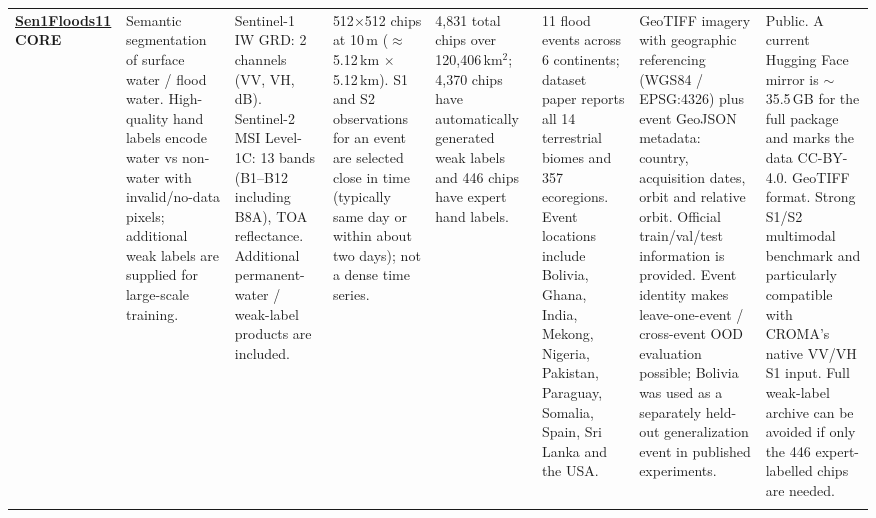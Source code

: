 \documentclass[11pt,a4paper]{article}
\begin{document}
\begin{landscape}
\begin{longtable}{
    Q{1.8cm}
    Q{2.5cm}
    Q{3.0cm}
    Q{2.5cm}
    Q{2.1cm}
    Q{3.0cm}
    Q{3.4cm}
    Q{3.4cm}
}
\href{https://github.com/cloudtostreet/Sen1Floods11}{\textbf{Sen1Floods11}}\newline
\textbf{CORE}
&
Semantic segmentation of surface water / flood water. High-quality hand labels encode water vs non-water with invalid/no-data pixels; additional weak labels are supplied for large-scale training.
&
Sentinel-1 IW GRD: 2 channels (VV, VH, dB). Sentinel-2 MSI Level-1C: 13 bands (B1--B12 including B8A), TOA reflectance. Additional permanent-water / weak-label products are included.
&
512$\times$512 chips at 10\,m ($\approx$5.12\,km $\times$ 5.12\,km). S1 and S2 observations for an event are selected close in time (typically same day or within about two days); not a dense time series.
&
4,831 total chips over 120,406\,km$^2$; 4,370 chips have automatically generated weak labels and 446 chips have expert hand labels.
&
11 flood events across 6 continents; dataset paper reports all 14 terrestrial biomes and 357 ecoregions. Event locations include Bolivia, Ghana, India, Mekong, Nigeria, Pakistan, Paraguay, Somalia, Spain, Sri Lanka and the USA.
&
GeoTIFF imagery with geographic referencing (WGS84 / EPSG:4326) plus event GeoJSON metadata: country, acquisition dates, orbit and relative orbit. Official train/val/test information is provided. Event identity makes leave-one-event / cross-event OOD evaluation possible; Bolivia was used as a separately held-out generalization event in published experiments.
&
Public. A current Hugging Face mirror is $\sim$35.5\,GB for the full package and marks the data CC-BY-4.0. GeoTIFF format. Strong S1/S2 multimodal benchmark and particularly compatible with CROMA's native VV/VH S1 input. Full weak-label archive can be avoided if only the 446 expert-labelled chips are needed.
\\
\addlinespace


\end{longtable}
\end{landscape}
\end{document}
